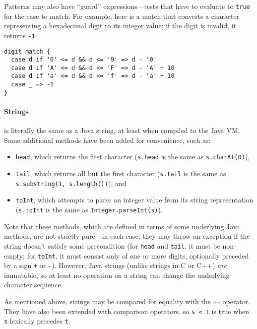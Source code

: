 Patterns may also have ``guard'' expressions---tests that have to evaluate to \verb|true| for the case to match. For example, here is a match that converts a character representing a hexadecimal digit to its integer value; if the digit is invalid, it returns \verb|-1|:
\begin{verbatim}
digit match {
  case d if '0' <= d && d <= '9' => d - '0'
  case d if 'A' <= d && d <= 'F' => d - 'A' + 10
  case d if 'a' <= d && d <= 'f' => d - 'a' + 10
  case _ => -1
}
\end{verbatim}

\paragraph{Strings}
 is literally the same as a Java string, at least when compiled to the Java VM. Some additional methods have been added for convenience, such as:
\begin{itemize}
\item \verb|head|, which returns the first character (\verb|s.head| is the same as \verb|s.charAt(0)|),
\item \verb|tail|, which returns all but the first character (\verb|s.tail| is the same as \verb|s.substring(1, s.length())|), and
\item \verb|toInt|, which attempts to parse an integer value from its string representation (\verb|s.toInt| is the same as \verb|Integer.parseInt(s)|).
\end{itemize}
Note that these methods, which are defined in terms of some underlying Java methods, are not strictly pure---in each case, they may throw an exception if the string doesn't satisfy some precondition (for \verb|head| and \verb|tail|, it must be non-empty; for \verb|toInt|, it must consist only of one or more digits, optionally preceded by a sign \verb|+| or \verb|-|). However, Java strings (unlike strings in C or C++) \emph{are} immutable, so at least no operation on a string can change the underlying character sequence.

As mentioned above, strings may be compared for equality with the \verb|==| operator. They have also been extended with comparison operators, so \verb|s < t| is true when \verb|s| lexically precedes \verb|t|.


